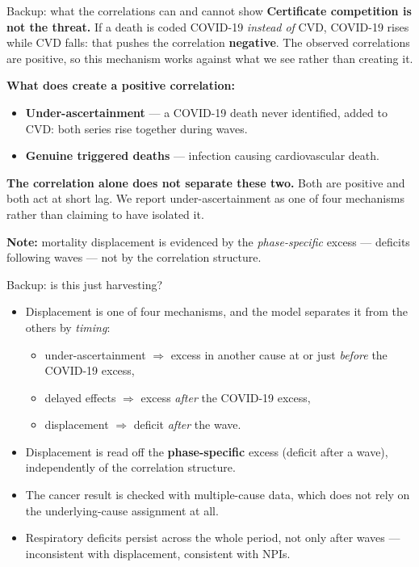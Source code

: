 \documentclass[aspectratio=169,10pt]{beamer}
\newcommand{\compresslist}{%
  \setlength{\itemsep}{3pt}%
  \setlength{\parskip}{0pt}%
  \setlength{\parsep}{0pt}%
}
\newcommand{\punch}[1]{{\color{headerfontcol}\bfseries #1}}
\begin{document}
\begin{frame}{Backup: what the correlations can and cannot show}
  \textbf{Certificate competition is not the threat.} If a death is coded
  COVID-19 \emph{instead of} CVD, COVID-19 rises while CVD falls: that pushes the
  correlation \textbf{negative}. The observed correlations are positive, so this
  mechanism works against what we see rather than creating it.
  \vspace{0.5em}

  \textbf{What does create a positive correlation:}
  \begin{itemize}\compresslist
    \item \textbf{Under-ascertainment} --- a COVID-19 death never identified,
          added to CVD: both series rise together during waves.
    \item \textbf{Genuine triggered deaths} --- infection causing cardiovascular
          death.
  \end{itemize}
  \vspace{0.3em}
  \punch{The correlation alone does not separate these two.} Both are positive
  and both act at short lag. We report under-ascertainment as one of four
  mechanisms rather than claiming to have isolated it.
  \vspace{0.5em}

  \textbf{Note:} mortality displacement is evidenced by the \emph{phase-specific}
  excess --- deficits following waves --- not by the correlation structure.
\end{frame}

\begin{frame}{Backup: is this just harvesting?}
  \begin{itemize}\compresslist
    \item Displacement is one of four mechanisms, and the model separates it
          from the others by \emph{timing}:
      \begin{itemize}\compresslist
        \item under-ascertainment $\Rightarrow$ excess in another cause at or
              just \emph{before} the COVID-19 excess,
        \item delayed effects $\Rightarrow$ excess \emph{after} the COVID-19 excess,
        \item displacement $\Rightarrow$ deficit \emph{after} the wave.
      \end{itemize}
    \item Displacement is read off the \textbf{phase-specific} excess (deficit
          after a wave), independently of the correlation structure.
    \item The cancer result is checked with multiple-cause data, which does not
          rely on the underlying-cause assignment at all.
    \item Respiratory deficits persist across the whole period, not only after
          waves --- inconsistent with displacement, consistent with NPIs.
  \end{itemize}
\end{frame}
\end{document}
